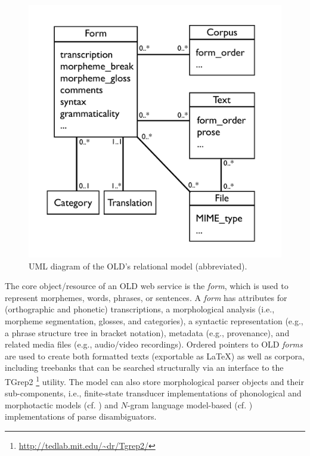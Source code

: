 \documentclass[11pt]{article}
\begin{document}
\begin{figure}[h]
\begin{center}
\includegraphics[scale=0.35]{images/OLD_relational_model_UML.pdf}
\caption{UML diagram of the OLD's relational model (abbreviated).}
\label{old-uml}
\end{center}
\end{figure}

The core object/resource of an OLD web service is the \textit{form}, which is
used to represent morphemes, words, phrases, or sentences. A \emph{form} has
attributes for (orthographic and phonetic) transcriptions, a morphological
analysis (i.e., morpheme segmentation, glosses, and categories), a syntactic
representation (e.g., a phrase structure tree in bracket notation), metadata
(e.g., provenance), and related media files (e.g., audio/video recordings).
Ordered pointers to OLD \emph{forms} are used to create both formatted texts
(exportable as LaTeX) as well as corpora, including treebanks that can be
searched structurally via an interface to the TGrep2%
\footnote{\url{http://tedlab.mit.edu/~dr/Tgrep2/}} %
utility. The model can also store morphological parser objects and their
sub-components, i.e., finite-state transducer implementations of phonological
and morphotactic models (cf. \cite{beesley2003finite}) and $N$-gram language
model-based (cf.  \cite{manning1999foundations}) implementations of parse
disambiguators.
\end{document}
